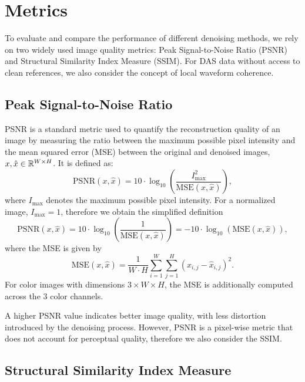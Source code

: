 \newpage

\section{Metrics}

To evaluate and compare the performance of different denoising methods, we rely on two widely used image quality metrics: Peak Signal-to-Noise Ratio (PSNR) and Structural Similarity Index Measure (SSIM).
For DAS data without access to clean references, we also consider the concept of local waveform coherence.

\subsection{Peak Signal-to-Noise Ratio}

PSNR is a standard metric used to quantify the reconstruction quality of an image by measuring the ratio between the maximum possible pixel intensity and the mean squared error (MSE) between the original and denoised images, $x, \hat{x} \in \mathbb{R}^{W \times H}$.
It is defined as:
\begin{equation}
    \text{PSNR}(x,\hat{x}) = 10 \cdot \log_{10} \left(\frac{I_{\text{max}}^2}{\text{MSE}(x,\hat{x})}\right),
\end{equation}
where $I_{\text{max}}$ denotes the maximum possible pixel intensity.
For a normalized image, $I_{\text{max}} = 1$, therefore we obtain the simplified definition
\begin{equation}\label{eq:PSNR}
    \text{PSNR}(x,\hat{x}) = 10 \cdot \log_{10} \left(\frac{1}{\text{MSE}(x,\hat{x})}\right) = -10 \cdot \log_{10}(\text{MSE}(x,\hat{x})),
\end{equation}
where the MSE is given by
\begin{equation}\label{eq:MSE}
    \text{MSE}(x,\hat{x}) = \frac{1}{W \cdot H} \sum_{i=1}^{W} \sum_{j=1}^{H} (x_{i,j} - \hat{x}_{i,j})^2.
\end{equation}
For color images with dimensions $3 \times W \times H$, the MSE is additionally computed across the 3 color channels.

A higher PSNR value indicates better image quality, with less distortion introduced by the denoising process.
However, PSNR is a pixel-wise metric that does not account for perceptual quality, therefore we also consider the SSIM\@.

\subsection{Structural Similarity Index Measure}

